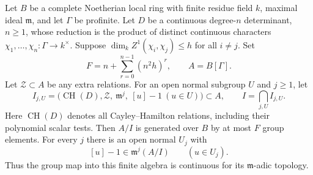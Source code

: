 \begin{srproposition}\label{prop:sr-finite-CH}
Let \(B\) be a complete Noetherian local ring with finite residue
field \(k\), maximal ideal \(\mathfrak m\), and let \(\Gamma\) be
profinite. Let \(D\) be a continuous degree-\(n\) determinant,
\(n\ge1\), whose reduction is the product of distinct continuous
characters \(\chi_1,\ldots,\chi_n:\Gamma\to k^\times\).
Suppose
\(\dim_k Z^1(\chi_i,\chi_j)\le h\) for all \(i\ne j\).
Set
\[
 F=n+\sum_{r=0}^{n-1}(n^2h)^r,\qquad A=B[\Gamma].
\]
Let \(\mathcal Z\subset A\) be any extra relations.
For an open normal subgroup \(U\) and \(j\ge1\), let
\[
 I_{j,U}=
 \bigl(\operatorname{CH}(D),\mathcal Z,\
             \mathfrak m^j,\ [u]-1\ (u\in U)\bigr)\subset A,
 \qquad I=\bigcap_{j,U}I_{j,U}.
\]
Here \(\operatorname{CH}(D)\) denotes all Cayley--Hamilton relations,
including their polynomial scalar tests.
Then \(A/I\) is generated over \(B\) by at most \(F\) group elements.
For every \(j\) there is an open normal \(U_j\) with
\[
                    [u]-1\in\mathfrak m^j(A/I)
                      \qquad(u\in U_j).
\]
Thus the group map into this finite algebra is continuous for its
\(\mathfrak m\)-adic topology.
\end{srproposition}
